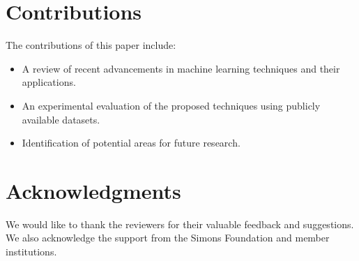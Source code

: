 \documentclass{article}
\begin{document}
\section{Contributions}
The contributions of this paper include:
\begin{itemize}
    \item A review of recent advancements in machine learning techniques and their applications.
    \item An experimental evaluation of the proposed techniques using publicly available datasets.
    \item Identification of potential areas for future research.
\end{itemize}

\section*{Acknowledgments}
We would like to thank the reviewers for their valuable feedback and suggestions. We also acknowledge the support from the Simons Foundation and member institutions.



\end{document}
